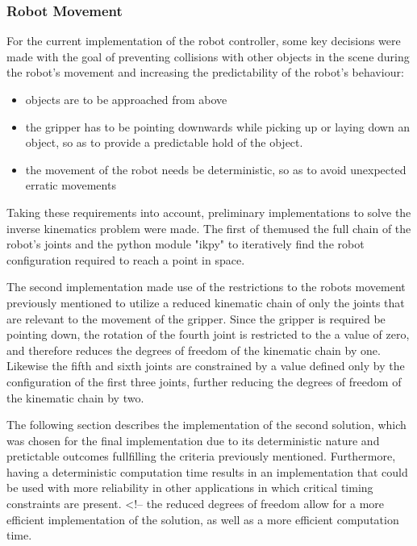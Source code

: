 \subsubsection{Robot Movement}

For the current implementation of the robot controller, some key decisions were made with the goal of preventing collisions with other objects in the scene during the robot's movement and increasing the predictability of the robot's behaviour:

\begin{itemize}
    \item objects are to be approached from above
    \item the gripper has to be pointing downwards while picking up or laying down an object, so as to provide a predictable hold of the object.
    \item the movement of the robot needs be deterministic, so as to avoid unexpected erratic movements
\end{itemize}

Taking these requirements into account, preliminary implementations to solve the inverse kinematics problem were made. The first of themused the full chain of the robot's joints and the python module "ikpy" to iteratively find the robot configuration required to reach a point in space.

The second implementation made use of the restrictions to the robots movement previously mentioned to utilize a reduced kinematic chain of only the joints that are relevant to the movement of the gripper.
Since the gripper is required be pointing down, the rotation of the fourth joint is restricted to the a value of zero, and therefore reduces the degrees of freedom of the kinematic chain by one. Likewise the fifth and sixth joints are constrained by a value defined only by the configuration of the first three joints, further reducing the degrees of freedom of the kinematic chain by two.

The following section describes the implementation of the second solution, which was chosen for the final implementation due to its deterministic nature and pretictable outcomes fullfilling the criteria previously mentioned. Furthermore, having a deterministic computation time results in an implementation that could be used with more reliability in other applications in which critical timing constraints are present.
<!-- 
the reduced degrees of freedom allow for a more efficient implementation of the solution, as well as a more efficient computation time.


